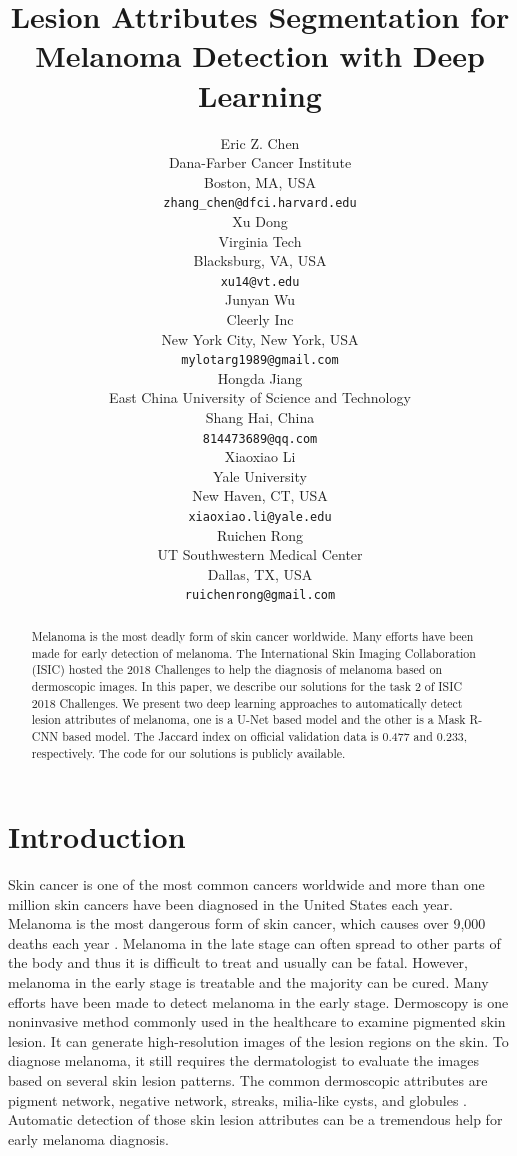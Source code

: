 \documentclass{article}
\title{Lesion Attributes Segmentation for Melanoma Detection with Deep Learning}
\author{
  Eric Z. Chen \\
  Dana-Farber Cancer Institute\\
  Boston, MA, USA \\
  \texttt{zhang\_chen@dfci.harvard.edu} \\
  \And
  Xu Dong \\
  Virginia Tech \\
  Blacksburg, VA, USA \\
  \texttt{xu14@vt.edu} \\
  \AND
  Junyan Wu \\
  Cleerly Inc \\
  New York City, New York, USA \\
  \texttt{mylotarg1989@gmail.com} \\
  \And
  Hongda Jiang \\
  East China University of Science and Technology \\
  Shang Hai, China \\
  \texttt{814473689@qq.com} \\
  \And
  Xiaoxiao Li \\
  Yale University \\
  New Haven, CT, USA \\
  \texttt{xiaoxiao.li@yale.edu} \\
  \And
  Ruichen Rong \\
  UT Southwestern Medical Center \\
  Dallas, TX, USA \\
  \texttt{ruichenrong@gmail.com} \\
}
\begin{document}


\maketitle

\begin{abstract}
Melanoma is the most deadly form of skin cancer worldwide. Many efforts have been made for early detection of melanoma. The International Skin Imaging Collaboration (ISIC) hosted the 2018 Challenges to help the diagnosis of melanoma based on dermoscopic images. In this paper, we describe our solutions for the task 2 of ISIC 2018 Challenges. We present two deep learning approaches to automatically detect lesion attributes of melanoma, one is a U-Net based model and the other is a Mask R-CNN based model. The Jaccard index on official validation data is 0.477 and 0.233, respectively. The code for our solutions is publicly available. 
\end{abstract}


\section{Introduction}



Skin cancer is one of the most common cancers worldwide and more than one million skin cancers have been diagnosed in the United States each year. Melanoma is the most dangerous form of skin cancer, which causes over 9,000 deaths each year \citep{ucsw2013united}. Melanoma in the late stage can often spread to other parts of the body and thus it is difficult to treat and usually can be fatal. However, melanoma in the early stage is treatable and the majority can be cured. Many efforts have been made to detect melanoma in the early stage. Dermoscopy is one noninvasive method commonly used in the healthcare to examine pigmented skin lesion. It can generate high-resolution images of the lesion regions on the skin. To diagnose melanoma, it still requires the dermatologist to evaluate the images based on several skin lesion patterns. The common dermoscopic attributes are pigment network, negative network, streaks, milia-like cysts, and globules \citep{mishra2016overview}. Automatic detection of those skin lesion attributes can be a tremendous help for early melanoma diagnosis. 
\end{document}
